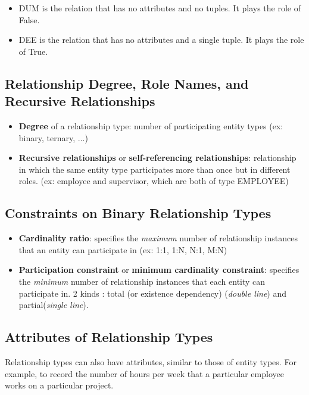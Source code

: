 \begin{itemize}
    \begin{itemize}
        \item DUM is the relation that has no attributes and no tuples. It plays the role of False.
        \item DEE is the relation that has no attributes and a single tuple. It plays the role of True.
    \end{itemize}



    \subsection{Relationship Degree, Role Names, and Recursive Relationships}

    \begin{itemize}
        \item \textbf{Degree} of a relationship type: number of participating entity types (ex: binary, ternary, ...)
         \item \textbf{Recursive relationships} or \textbf{self-referencing relationships}: relationship in which the same entity type participates more than once but in different roles. (ex: employee and supervisor, which are both of type EMPLOYEE)
    \end{itemize}

    \subsection{Constraints on Binary Relationship Types}
    
    \begin{itemize}
        \item \textbf{Cardinality ratio}: specifies the \emph{maximum} number of relationship instances that an entity can participate in (ex: 1:1, 1:N, N:1, M:N)
        \item \textbf{Participation constraint} or \textbf{minimum cardinality constraint}: specifies the \emph{minimum} number of relationship instances that each entity can participate in. 2 kinds : total (or existence dependency) (\emph{double line}) and partial(\emph{single line}).
    \end{itemize}
    
    \subsection{Attributes of Relationship Types}
    Relationship types can also have attributes, similar to those of entity types. For example, to record the number of hours per week that a particular employee works on a particular project.
    

\end{itemize}
